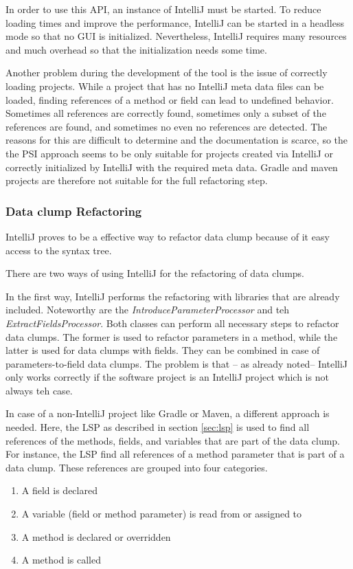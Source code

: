 In order to use this API, an instance of IntelliJ must be started. To reduce loading times and improve the performance, IntelliJ can be started in a headless mode so that no GUI is initialized. Nevertheless, IntelliJ requires many resources and much overhead so that  the initialization  needs some time.

Another problem during the development of the tool is the issue of correctly loading projects. While a project that has no IntelliJ meta data files can be loaded, finding references of a method or field can lead to undefined behavior. Sometimes all references are correctly found, sometimes only a subset of the references are found, and sometimes no even no references are detected. The reasons for this are difficult to determine and the documentation is scarce, so the the PSI approach seems to be only suitable for projects created via IntelliJ or correctly initialized by IntelliJ with the required meta data. Gradle and maven projects are therefore not suitable for the full refactoring step. 

\subsubsection{Data clump Refactoring}

IntelliJ proves to be a effective way to refactor data clump because of it easy access to the syntax tree.

There are two ways of using IntelliJ for the refactoring of data clumps.

In the first way, IntelliJ performs the refactoring with libraries that are already included. Noteworthy are the \textit{IntroduceParameterProcessor} and teh \textit{ExtractFieldsProcessor}. Both classes can perform all necessary steps to refactor data clumps. The former is used to refactor parameters in a method, while the latter is used for data clumps with fields. They can be combined in case of parameters-to-field data clumps. The problem is that -- as already noted-- IntelliJ only works correctly if the software project is an IntelliJ project which is not always teh case.

In case of a non-IntelliJ project like Gradle or Maven, a different approach is needed. Here, the \ac{LSP} as described in section \ref{sec:lsp} is used to find all references of the methods, fields, and variables that are part of the data clump. For instance, the \ac{LSP} find all references of a method parameter that is part of a data clump. These references are grouped into four categories. 
\begin{enumerate}
     \item A field is declared
    \item A variable (field or method parameter) is read from or assigned to
   
    \item A method is declared or overridden
    \item A method is called
\end{enumerate}

